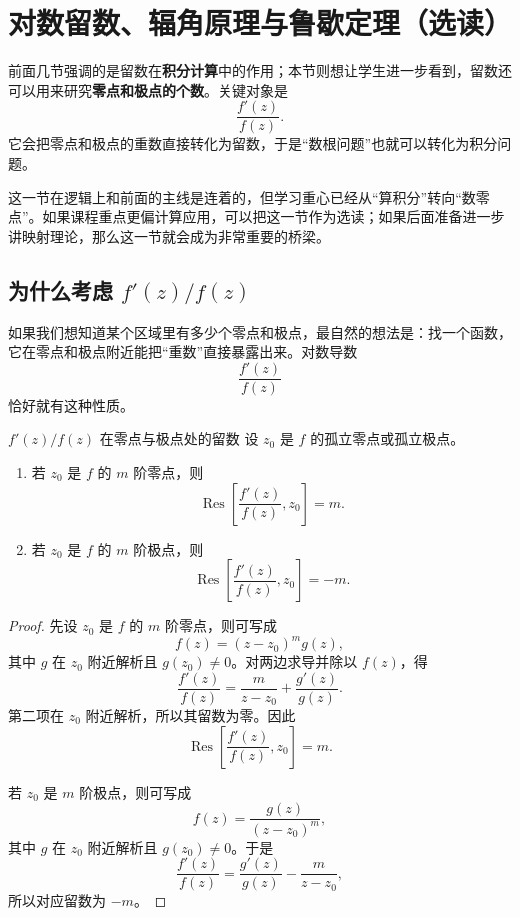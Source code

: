 \section{对数留数、辐角原理与鲁歇定理（选读）}

\begin{wulibj}[本节的任务]
前面几节强调的是留数在\textbf{积分计算}中的作用；本节则想让学生进一步看到，留数还可以用来研究\textbf{零点和极点的个数}。关键对象是
\[
    \frac{f'(z)}{f(z)}.
\]
它会把零点和极点的重数直接转化为留数，于是``数根问题''也就可以转化为积分问题。
\end{wulibj}

\begin{tishi}[选读说明]
这一节在逻辑上和前面的主线是连着的，但学习重心已经从``算积分''转向``数零点''。如果课程重点更偏计算应用，可以把这一节作为选读；如果后面准备进一步讲映射理论，那么这一节就会成为非常重要的桥梁。
\end{tishi}

\subsection{\texorpdfstring{为什么考虑 $f'(z)/f(z)$}{为什么考虑 f'(z)/f(z)}}

如果我们想知道某个区域里有多少个零点和极点，最自然的想法是：找一个函数，它在零点和极点附近能把``重数''直接暴露出来。对数导数
\[
    \frac{f'(z)}{f(z)}
\]
恰好就有这种性质。

\begin{dingli}{\texorpdfstring{$f'(z)/f(z)$}{f'(z)/f(z)} 在零点与极点处的留数}{}
设 $z_0$ 是 $f$ 的孤立零点或孤立极点。
\begin{enumerate}
    \item 若 $z_0$ 是 $f$ 的 $m$ 阶零点，则
    \[
        \operatorname{Res}\left[\frac{f'(z)}{f(z)},z_0\right]=m.
    \]
    \item 若 $z_0$ 是 $f$ 的 $m$ 阶极点，则
    \[
        \operatorname{Res}\left[\frac{f'(z)}{f(z)},z_0\right]=-m.
    \]
\end{enumerate}
\end{dingli}

\begin{proof}
先设 $z_0$ 是 $f$ 的 $m$ 阶零点，则可写成
\[
    f(z)=(z-z_0)^m g(z),
\]
其中 $g$ 在 $z_0$ 附近解析且 $g(z_0)\neq 0$。对两边求导并除以 $f(z)$，得
\[
    \frac{f'(z)}{f(z)}
    =
    \frac{m}{z-z_0}+\frac{g'(z)}{g(z)}.
\]
第二项在 $z_0$ 附近解析，所以其留数为零。因此
\[
    \operatorname{Res}\left[\frac{f'(z)}{f(z)},z_0\right]=m.
\]

若 $z_0$ 是 $m$ 阶极点，则可写成
\[
    f(z)=\frac{g(z)}{(z-z_0)^m},
\]
其中 $g$ 在 $z_0$ 附近解析且 $g(z_0)\neq 0$。于是
\[
    \frac{f'(z)}{f(z)}
    =
    \frac{g'(z)}{g(z)}-\frac{m}{z-z_0},
\]
所以对应留数为 $-m$。
\end{proof}

